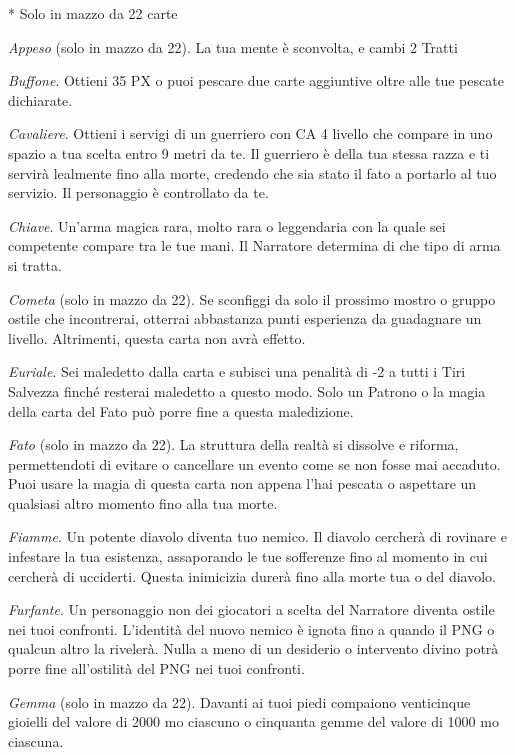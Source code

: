 \begin{multicols}{2}

	\medskip

	* Solo in mazzo da 22 carte

	\textit{Appeso} (solo in mazzo da 22). La tua mente è sconvolta, e cambi 2 Tratti

	\textit{Buffone}. Ottieni 35 PX o puoi pescare due carte aggiuntive oltre alle tue pescate dichiarate.

	\textit{Cavaliere}. Ottieni i servigi di un guerriero con CA 4 livello che compare in uno spazio a tua scelta entro 9 metri da te. Il guerriero è della tua stessa razza e ti servirà lealmente fino alla morte, credendo che sia stato il fato a portarlo al tuo servizio. Il personaggio è controllato da te.

	\textit{Chiave}. Un'arma magica rara, molto rara o leggendaria con la quale sei competente compare tra le tue mani. Il Narratore determina di che tipo di arma si tratta.

	\textit{Cometa} (solo in mazzo da 22). Se sconfiggi da solo il prossimo mostro o gruppo ostile che incontrerai, otterrai abbastanza punti esperienza da guadagnare un livello. Altrimenti, questa carta non avrà effetto.

	\textit{Euriale}. Sei maledetto dalla carta e subisci una penalità di -2 a tutti i Tiri Salvezza finché resterai maledetto a questo modo. Solo un Patrono o la magia della carta del Fato può porre fine a questa maledizione.

	\textit{Fato} (solo in mazzo da 22). La struttura della realtà si dissolve e riforma, permettendoti di evitare o cancellare un evento come se non fosse mai accaduto. Puoi usare la magia di questa carta non appena l'hai pescata o aspettare un qualsiasi altro momento fino alla tua morte.

	\textit{Fiamme}. Un potente diavolo diventa tuo nemico. Il diavolo cercherà di rovinare e infestare la tua esistenza, assaporando le tue sofferenze fino al momento in cui cercherà di ucciderti. Questa inimicizia durerà fino alla morte tua o del diavolo.

	\textit{Furfante}. Un personaggio non dei giocatori a scelta del Narratore diventa ostile nei tuoi confronti. L'identità del nuovo nemico è ignota fino a quando il PNG o qualcun altro la rivelerà. Nulla a meno di un desiderio o intervento divino potrà porre fine all'ostilità del PNG nei tuoi confronti.

	\textit{Gemma} (solo in mazzo da 22). Davanti ai tuoi piedi compaiono venticinque gioielli del valore di 2000 mo ciascuno o cinquanta gemme del valore di 1000 mo ciascuna.


\end{multicols}
